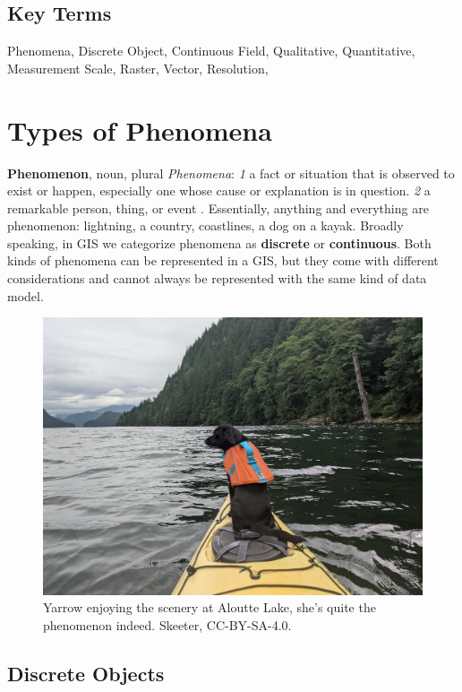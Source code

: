 \documentclass[
]{book}
\begin{document}
\hypertarget{key-terms-2}{%
\subsection*{Key Terms}\label{key-terms-2}}

Phenomena, Discrete Object, Continuous Field, Qualitative, Quantitative, Measurement Scale, Raster, Vector, Resolution,

\hypertarget{types-of-phenomena}{%
\section{Types of Phenomena}\label{types-of-phenomena}}

\textbf{Phenomenon}, noun, plural \emph{Phenomena}: \emph{1} a fact or situation that is observed to exist or happen, especially one whose cause or explanation is in question. \emph{2} a remarkable person, thing, or event \citep{oxford_languages_phenomena_nodate}. Essentially, anything and everything are phenomenon: lightning, a country, coastlines, a dog on a kayak. Broadly speaking, in GIS we categorize phenomena as \textbf{discrete} or \textbf{continuous}. Both kinds of phenomena can be represented in a GIS, but they come with different considerations and cannot always be represented with the same kind of data model.

\begin{figure}
\includegraphics[width=0.75\linewidth]{images/03-dog-on-a-boat} \caption{Yarrow enjoying the scenery at Aloutte Lake, she's quite the phenomenon indeed. Skeeter, CC-BY-SA-4.0.}\label{fig:3-dog-on-a-boat}
\end{figure}

\hypertarget{discrete-objects}{%
\subsection{Discrete Objects}\label{discrete-objects}}
\end{document}

